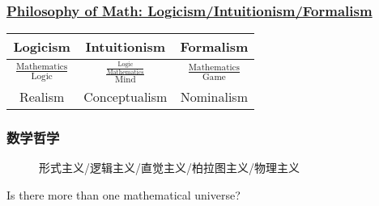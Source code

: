 \documentclass[UTF8,11pt,colorlinks,compress,openany]{beamer}%
\begin{document}
\begin{frame}\frametitle{\href{https://www.maa.org/programs/maa-awards/writing-awards/the-three-crises-in-mathematics-logicism-intuitionism-and-formalism}{Philosophy of Math: Logicism/Intuitionism/Formalism}}
\begin{figure}
\end{figure}
\begin{table}
\begin{tabu}{c|c|c}
\hline
Logicism & Intuitionism & Formalism\\
\hline
$\frac{\operatorname{Mathematics}}{\operatorname{Logic}}$ & $\frac{\frac{\operatorname{Logic}}{\operatorname{Mathematics}}}{\operatorname{Mind}}$ & $\frac{\operatorname{Mathematics}}{\operatorname{Game}}$\\
\hline
Realism & Conceptualism & Nominalism\\
\hline
\end{tabu}
\end{table}
\end{frame}

\begin{frame}\frametitle{数学哲学}
\begin{figure}[H]
\caption{形式主义/逻辑主义/直觉主义/柏拉图主义/物理主义}
\end{figure}
\centerline{Is there more than one mathematical universe?}
\end{frame}
\end{document}
